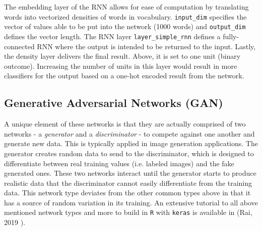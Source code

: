 The embedding layer of the RNN allows for ease of computation by
translating words into vectorized densities of words in vocabulary.
\texttt{input\_dim} specifies the vector of values able to be put into
the network (1000 words) and \texttt{output\_dim} defines the vector
length. The RNN layer \texttt{layer\_simple\_rnn} defines a
fully-connected RNN where the output is intended to be returned to the
input. Lastly, the density layer delivers the final result. Above, it is
set to one unit (binary outcome). Increasing the number of units in this
layer would result in more classifiers for the output based on a one-hot
encoded result from the network.

\hypertarget{generative-adversarial-networks-gan}{%
\subsection{Generative Adversarial Networks
(GAN)}\label{generative-adversarial-networks-gan}}

A unique element of these networks is that they are actually comprised of two networks - a \textit{generator} and a \textit{discriminator} - to compete against one another and generate new data.  This is typically applied in image generation applications.  The generator creates random data to send to the discriminator, which is designed to differentiate between real training values (i.e. labeled images) and the fake generated ones.  These two networks interact until the generator starts to produce realistic data that the discriminator cannot easily differentiate from the training data.  This network type deviates from the other common types above in that it has a source of random variation in its training.  An extensive tutorial to all above mentioned network types and more to build in \texttt{R} with \texttt{keras} is available in (Rai, 2019 \cite{rai}).